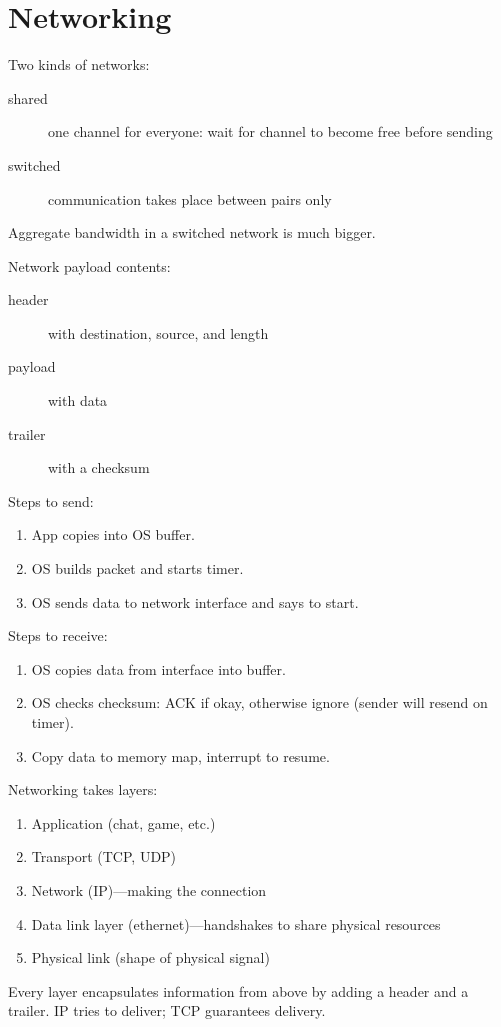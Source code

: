 \section{Networking}
Two kinds of networks:
\begin{description}
	\item[shared] one channel for everyone: wait for channel to become free before sending
	\item[switched] communication takes place between pairs only
\end{description}
Aggregate bandwidth in a switched network is much bigger.

Network payload contents:
\begin{description}
	\item[header] with destination, source, and length
	\item[payload] with data
	\item[trailer] with a checksum
\end{description}

Steps to send:
\begin{enumerate}
	\item App copies into OS buffer.
	\item OS builds packet and starts timer.
	\item OS sends data to network interface and says to start.
\end{enumerate}
Steps to receive:
\begin{enumerate}
	\item OS copies data from interface into buffer.
	\item OS checks checksum: ACK if okay, otherwise ignore (sender will resend on timer).
	\item Copy data to memory map, interrupt to resume.
\end{enumerate}

Networking takes layers:
\begin{enumerate}
	\item Application (chat, game, etc.)
	\item Transport (TCP, UDP)
	\item Network (IP)---making the connection
	\item Data link layer (ethernet)---handshakes to share physical resources
	\item Physical link (shape of physical signal)
\end{enumerate}
Every layer encapsulates information from above by adding a header and a trailer. IP tries to deliver; TCP guarantees delivery.